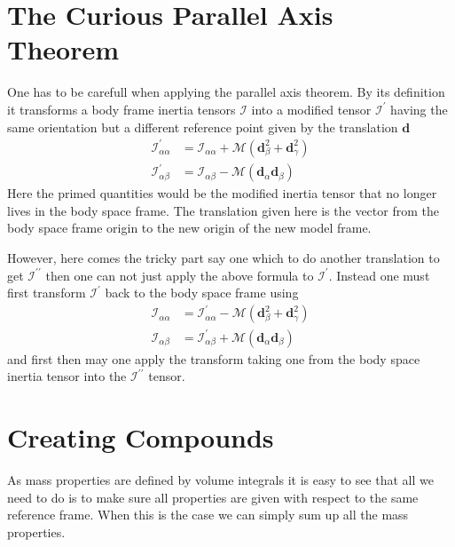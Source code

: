 \documentclass[twocolumn]{article}
\renewcommand{\vec}[1]{ \ensuremath{\mathbf{#1} } }
\newcommand{\inertia}{\ensuremath{\mathcal{I} }}
\newcommand{\mass}{\ensuremath{\mathcal{M} }}
\begin{document}
\section*{The Curious Parallel Axis Theorem}\label{sec:curi-parall-axis}
One has to be carefull when applying the parallel axis theorem. By its
definition it transforms a body frame inertia tensors $\inertia$ into a modified
tensor $\inertia^\prime$
having the same orientation but a different reference point given by the
translation $\vec d$
\begin{subequations}
  \begin{align}
    \inertia_{\alpha \alpha}^\prime
    &=
    \inertia_{\alpha \alpha} + \mass (\vec d_{\beta}^2  + \vec d_{\gamma}^2)\\
    \inertia_{\alpha \beta}^\prime &=  \inertia_{\alpha \beta} - \mass (\vec
    d_{\alpha} \vec d_{\beta})
  \end{align}
\end{subequations}
Here the primed quantities would be the modified inertia tensor that no longer
lives in the body space frame. The translation given here is the vector from the
body space frame origin to the new origin of the new model frame.

However, here comes the tricky part say one which to do another translation to
get $\inertia^{\prime\prime}$ then one can not just apply the above formula to
$\inertia^\prime$. Instead one must first transform $\inertia^\prime$ back to the
body space frame using
\begin{subequations}
  \begin{align}
    \inertia_{\alpha \alpha}
    &=
    \inertia_{\alpha \alpha}^\prime - \mass (\vec d_{\beta}^2  + \vec d_{\gamma}^2)
    \\
    \inertia_{\alpha \beta}
    &=
    \inertia_{\alpha \beta}^\prime + \mass (\vec d_{\alpha} \vec d_{\beta})
  \end{align}
\end{subequations}
and first then may one apply the transform taking one from the body space
inertia tensor into the $\inertia^{\prime\prime}$ tensor.

\section*{Creating Compounds}\label{sec:creating-compounds}
As mass properties are defined by volume integrals it is easy to see that all we
need to do is to make sure all properties are given with respect to the same
reference frame. When this is the case we can simply sum up all the mass
properties.
\end{document}
